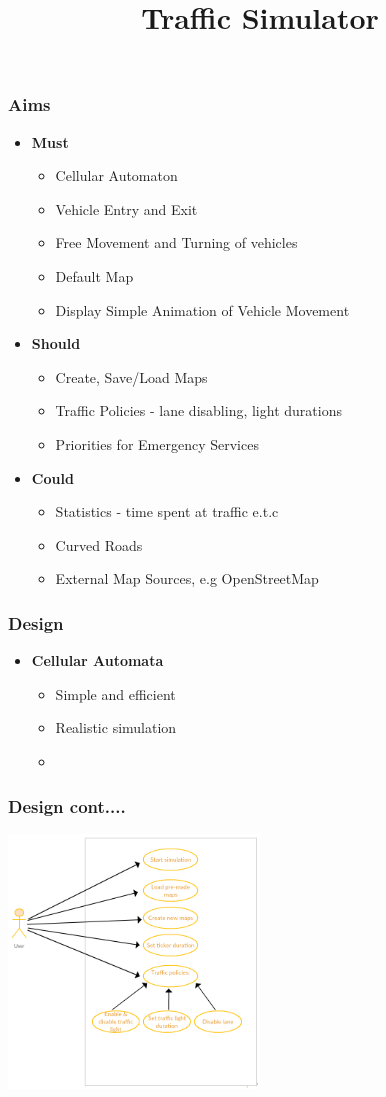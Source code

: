 \documentclass{beamer}
\author[Team LondonSW]
{%
   \texorpdfstring{
        \begin{columns}
            \column{.30\linewidth}
            \RBox{ Violetta Avkhukova}
        \end{columns}
        \begin{columns}
            \column{.30\linewidth}
            \RBox{Yakubu Aliyu Doma}
        \end{columns}
        \begin{columns}
            \column{.30\linewidth}
            \RBox{Rawan Mohammed Alrahili}
        \end{columns}
        \begin{columns}
            \column{.30\linewidth}
            \RBox{Felix Santiago Anda Basabe}
        \end{columns}
        \begin{columns}
            \column{.30\linewidth}
            \RBox{Jia Liu}
        \end{columns}
        \vspace{-0.3cm}
        \begin{columns}
          \column{0.3\linewidth}
          \raggedleft
           \texttt{[image: logo\_map]}
            \vspace{-3 cm}
            \column{0.6\linewidth}
            \raggedright
            \textbf{7CCSMGPR}\\
            \vspace{-4.8cm}
        \end{columns}
   }
   {}
}
\title{Traffic Simulator}
\begin{document}
\begin{frame}
\titlepage
\end{frame}

  
  \begin{frame}
\frametitle{Aims}
   \begin{itemize}
	\item \textbf{Must}
			\begin{itemize}
			\item{Cellular Automaton}
			\item{Vehicle Entry and Exit}
			\item{ Free Movement and Turning of vehicles}
			\item{Default Map}
			\item{Display Simple Animation of Vehicle Movement}	
		\end{itemize}	
	\item \textbf{Should}
			\begin{itemize}
			\item{Create, Save/Load Maps}
			\item{Traffic Policies - lane disabling, light durations}
			\item{Priorities for  Emergency Services}
		\end{itemize}
\item \textbf{Could}
			\begin{itemize}
			\item{Statistics - time spent at traffic e.t.c}
			\item{Curved Roads}
			\item{External Map Sources, e.g OpenStreetMap}
		\end{itemize}	
	\end{itemize}	
  \end{frame}
  
  \begin{frame}
    \frametitle{Design}
       \begin{itemize}
	    \item \textbf{Cellular Automata}
			\begin{itemize}
			\item{Simple and efficient}
			\item{Realistic simulation}
			\item{ }
		\end{itemize}
	\end{itemize}
  \end{frame}
  
  	\begin{frame}
	  \frametitle{Design cont....}
	    \includegraphics[width=0.50\textwidth, center]{UseCase}
	  
	  \end{frame}
\end{document}
